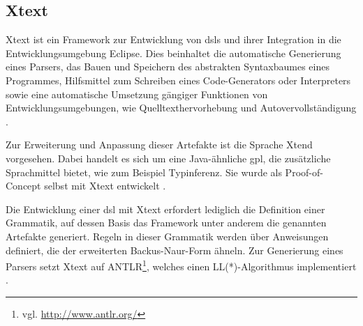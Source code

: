 \subsection{Xtext}
    Xtext ist ein Framework zur Entwicklung von \glspl{dsl} und ihrer Integration
    in die Entwicklungsumgebung Eclipse.
    Dies beinhaltet die automatische Generierung eines Parsers,
    das Bauen und Speichern des abstrakten Syntaxbaumes eines Programmes,
    Hilfsmittel zum Schreiben eines Code-Generators oder Interpreters
    sowie eine automatische Umsetzung gängiger Funktionen von
    Entwicklungsumgebungen, wie Quelltexthervorhebung und Autovervollständigung
    \cite[Kapitel 1]{bettini:xtext}.

    Zur Erweiterung und Anpassung dieser Artefakte ist die Sprache Xtend vorgesehen.
    Dabei handelt es sich um eine Java-ähnliche \gls{gpl},
    die zusätzliche Sprachmittel bietet, wie zum Beispiel Typinferenz.
    Sie wurde als Proof-of-Concept selbst mit Xtext entwickelt
    \cite[Kapitel 3]{bettini:xtext}.

    Die Entwicklung einer \gls{dsl} mit Xtext erfordert lediglich die Definition
    einer Grammatik, auf dessen Basis das Framework unter anderem die genannten 
    Artefakte generiert.
    Regeln in dieser Grammatik werden über Anweisungen definiert,
    die der erweiterten Backus-Naur-Form ähneln.
    Zur Generierung eines Parsers setzt Xtext auf
    ANTLR\footnote{vgl. \url{http://www.antlr.org/}},
    welches einen LL(*)-Algorithmus implementiert
    \cite{xtext:documentation,parr:antlr}.
